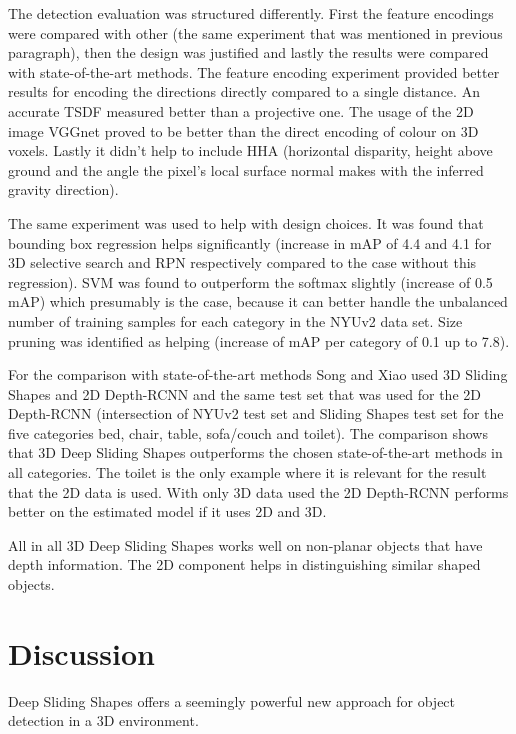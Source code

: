 \documentclass[12pt]{scrartcl}
\begin{document}
The detection evaluation was structured differently. First the feature encodings
were compared with other (the same experiment that was mentioned in previous
paragraph), then the design was justified and lastly the results were compared
with state-of-the-art methods. The feature encoding experiment provided better
results for encoding the directions directly compared to a single distance.
An accurate TSDF measured better than a projective one. The usage of the 2D image
VGGnet proved to be better than the direct encoding of colour on 3D voxels.
Lastly it didn't help to include HHA (horizontal disparity, height above ground
and the angle the pixel's local surface normal makes with the inferred gravity
direction).

The same experiment was used to help with design choices. It was found that
bounding box regression helps significantly (increase in mAP of 4.4 and 4.1
for 3D selective search and RPN respectively compared to the case without this
regression). SVM was found to outperform the softmax slightly (increase of 0.5 mAP)
which presumably is the case, because it can better handle the unbalanced number of
training samples for each category in the NYUv2 data set. Size pruning was identified
as helping (increase of mAP per category of 0.1 up to 7.8).

For the comparison with state-of-the-art methods Song and Xiao used 3D Sliding
Shapes\cite{Song2014} and 2D Depth-RCNN\cite{Gupta2015} and the same test set
that was used for the 2D Depth-RCNN (intersection of NYUv2 test set and Sliding
Shapes test set for the five categories bed, chair, table, sofa/couch and toilet).
The comparison shows that 3D Deep Sliding Shapes outperforms the chosen state-of-the-art
methods in all categories. The toilet is the only example where it is relevant
for the result that the 2D data is used. With only 3D data used the 2D Depth-RCNN
performs better on the estimated model if it uses 2D and 3D.

All in all 3D Deep Sliding Shapes works well on non-planar objects that have depth
information. The 2D component helps in distinguishing similar shaped objects.

\section{Discussion} %
\label{sec:discussion}

Deep Sliding Shapes offers a seemingly powerful new approach for object detection
in a 3D environment.
\end{document}
